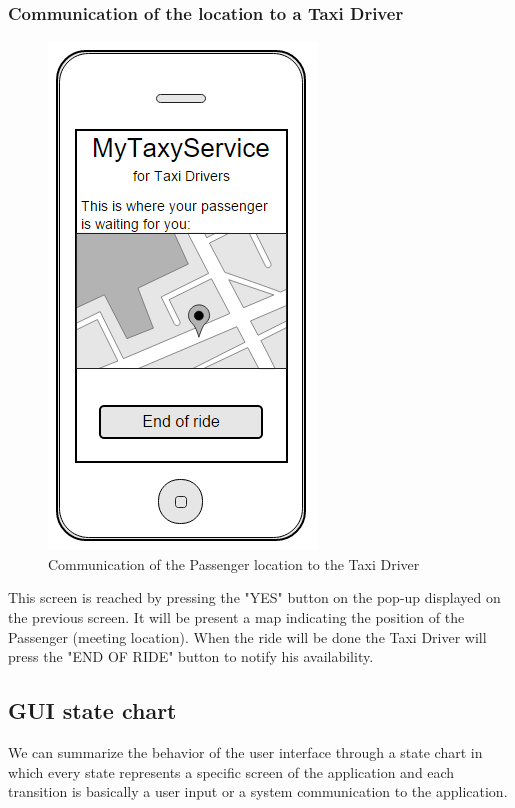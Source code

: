 \subsubsection{Communication of the location to a Taxi Driver}
\begin{figure}[H]
\centering
\includegraphics[scale=0.6]{Images/taxi_driver_busy}
\caption{Communication of the Passenger location to the Taxi Driver}
\end{figure}
This screen is reached by pressing the "YES" button on the pop-up displayed on the previous screen. It will be present a map indicating the position of the Passenger (meeting location). When the ride will be done the Taxi Driver will press the "END OF RIDE" button to notify his availability.

\pagebreak
\subsection{GUI state chart}
We can summarize the behavior of the user interface through a state chart in which every state represents a specific screen of the application and each transition is basically a user input or a system communication to the application.
